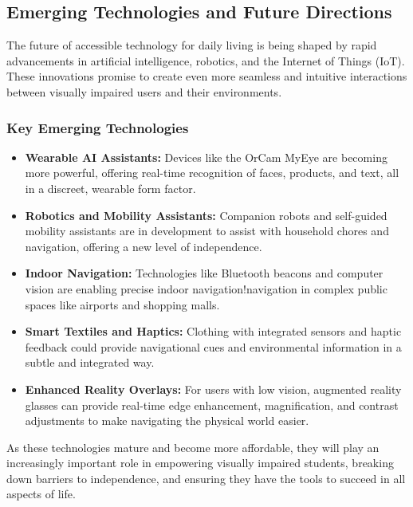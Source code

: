 \subsection{Emerging Technologies and Future Directions}

The future of accessible technology for daily living is being shaped by rapid advancements in artificial intelligence, robotics, and the Internet of Things (IoT). These innovations promise to create even more seamless and intuitive interactions between visually impaired users and their environments.

\subsubsection{Key Emerging Technologies}
\begin{itemize}
	\item \textbf{Wearable AI Assistants:} Devices like the OrCam MyEye are becoming more powerful, offering real-time recognition of faces, products, and text, all in a discreet, wearable form factor.\supercite{msseeingai, envision}
	\item \textbf{Robotics and Mobility Assistants:} Companion robots and self-guided mobility assistants are in development to assist with household chores and navigation, offering a new level of independence.\supercite{bipedai}
	\item \textbf{Indoor Navigation:} Technologies like Bluetooth beacons and computer vision are enabling precise indoor navigation!navigation in complex public spaces like airports and shopping malls.\supercite{navilens}
	\item \textbf{Smart Textiles and Haptics:} Clothing with integrated sensors and haptic feedback could provide navigational cues and environmental information in a subtle and integrated way.
	\item \textbf{Enhanced Reality Overlays:} For users with low vision, augmented reality glasses can provide real-time edge enhancement, magnification, and contrast adjustments to make navigating the physical world easier.
\end{itemize}
As these technologies mature and become more affordable, they will play an increasingly important role in empowering visually impaired students, breaking down barriers to independence, and ensuring they have the tools to succeed in all aspects of life.\supercite{wjaets2024, maitraye2024}
